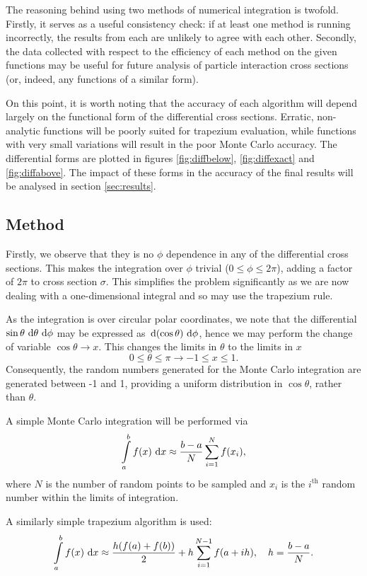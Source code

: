 \documentclass[]{article}
\begin{document}
The reasoning behind using two methods of numerical integration is twofold. Firstly, it serves as a useful consistency check: if at least one method is running incorrectly, the results from each are unlikely to agree with each other. Secondly, the data collected with respect to the efficiency of each method on the given functions may be useful for future analysis of particle interaction cross sections (or, indeed, any functions of a similar form).

On this point, it is worth noting that the accuracy of each algorithm will depend largely on the functional form of the differential cross sections. Erratic, non-analytic functions will be poorly suited for trapezium evaluation, while functions with very small variations will result in the poor Monte Carlo accuracy. The differential forms are plotted in figures \ref{fig:diffbelow}, \ref{fig:diffexact} and \ref{fig:diffabove}. The impact of these forms in the accuracy of the final results will be analysed in section \ref{sec:results}.

\subsection{Method}\label{ssec:method}

Firstly, we observe that they is no $\phi$ dependence in any of the differential cross sections. This makes the integration over $\phi$ trivial ($0\leq\phi\leq2\pi$), adding a factor of $2\pi$ to cross section $\sigma$. This simplifies the problem significantly as we are now dealing with a one-dimensional integral and so may use the trapezium rule.

As the integration is over circular polar coordinates, we note that the differential $\sin{\theta}\,\operatorname{d}\!{\theta}\,\operatorname{d}\!{\phi}$ may be expressed as $\,\operatorname{d}\!{(\cos{\theta})}\,\operatorname{d}\!{\phi}$, hence we may perform the change of variable $\cos{\theta} \to x$. This changes the limits in $\theta$ to the limits in $x$ $$0 \leq \theta \leq \pi \to -1 \leq x \leq 1.$$ Consequently, the random numbers generated for the Monte Carlo integration are generated between -1 and 1, providing a uniform distribution in $\cos{\theta}$, rather than $\theta$.

A simple Monte Carlo integration will be performed via $$\int\limits_{a}^{b}f(x)\,\operatorname{d}\!{x} \approx \frac{b-a}{N}\sum\limits_{i=1}^{N}f(x_{i}),$$ where $N$ is the number of random points to be sampled and $x_{i}$ is the $i^{\mathrm{th}}$ random number within the limits of integration.

A similarly simple trapezium algorithm is used: $$\int\limits_{a}^{b}f(x)\,\operatorname{d}\!{x} \approx \frac{h(f(a) + f(b))}{2} + h\sum\limits_{i=1}^{N-1}f(a+ih),\quad h=\frac{b-a}{N}.$$
\end{document}
